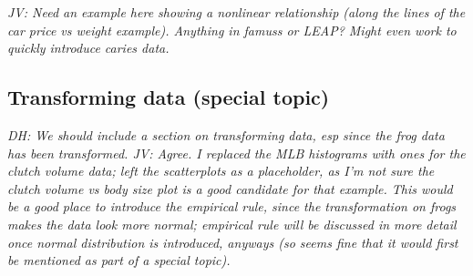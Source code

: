 \begin{doublespace}
\textit{JV: Need an example here showing a nonlinear relationship (along the lines of the car price vs weight example). Anything in famuss or LEAP? Might even work to quickly introduce caries data.}

\subsection{Transforming data (special topic)}
\label{transformingDataSubsection}


\textit{DH: We should include a section on transforming data, esp since the frog data has been transformed. JV: Agree. I replaced the MLB histograms with ones for the clutch volume data; left the scatterplots as a placeholder, as I'm not sure the clutch volume vs body size plot is a good candidate for that example. This would be a good place to introduce the empirical rule, since the transformation on frogs makes the data look more normal; empirical rule will be discussed in more detail once normal distribution is introduced, anyways (so seems fine that it would first be mentioned as part of a special topic).}


\end{doublespace}
